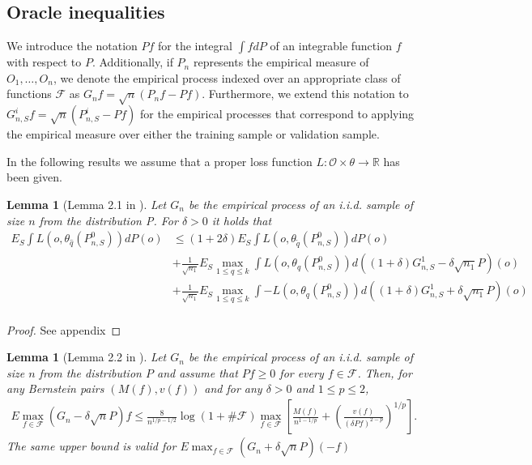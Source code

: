 \documentclass[11pt, a4paper]{article}
\newtheorem{lemma}[theorem]{Lemma}
\theoremstyle{definition}
\theoremstyle{remark}
\newcommand{\q}{q}
\newcommand{\btheta}{\theta}
\begin{document}
\subsection{Oracle inequalities}
We introduce the notation $Pf$ for the integral $\int f dP$ of an integrable function $f$ with respect to $P$. Additionally, if $P_n$ represents the empirical measure of $O_1, \dots, O_n$, we denote the empirical process indexed over an appropriate class of functions $\mathcal{F}$ as $G_n f = \sqrt{n}(P_n f - P f)$. Furthermore, we extend this notation to $G_{n, S}^{i} f = \sqrt{n}(P_{n, S}^{i} - Pf)$ for the empirical processes that correspond to applying the empirical measure over either the training sample or validation sample.

In the following results we assume that a proper loss function $ L: \mathcal{O} \times \btheta \to \mathbb{R} $ has been given.  
\begin{lemma}[Lemma 2.1 in \cite{vaart06}] \label{finitesampledecomp}
    Let $ G_{n} $ be the empirical process of an i.i.d. sample of size $ n $ from the distribution P. For $ \delta > 0 $ it holds that
   \begin{align*}
       E_{S} \int L(o, \btheta_{ \hat{\q}}(P_{n, S}^{0})) dP(o) &\leq (1 + 2 \delta) E_{S} \int L(o, \btheta_{ \tilde{\q} }(P_{n, S}^{0})) d P(o) \\ 
                                                                &+\frac{1}{\sqrt{n_1} } E_{S} \max_{1 \leq \q \leq k} \int L(o, \btheta_{\q}(P_{n, S}^{0})) d ((1 + \delta) G_{n,S}^{1} - \delta \sqrt{n_1} P)(o)  \\
                                                                &+\frac{1}{\sqrt{n_1} } E_{S} \max_{1 \leq \q \leq k} \int-L(o, \btheta_{\q}(P_{n, S}^{0})) d ((1 + \delta) G_{n,S}^{1} + \delta \sqrt{n_1} P)(o)  \\
   \end{align*}
\end{lemma}
\begin{proof}
    See appendix
\end{proof}

\begin{lemma}[Lemma 2.2 in \cite{vaart06}] \label{finitesamplebound}
    Let $G_{n}$ be the empirical process of an i.i.d. sample of size $n$ from the distribution $P$ and assume that $P f \geq 0$ for every $f \in \mathcal{F}$. Then, for any Bernstein pairs $(M(f), v(f))$ and for any $\delta>0$ and $1 \leq p \leq 2$,
    \begin{align*}
    E \max_{f \in \mathcal{F}}(G_n-\delta \sqrt{n} P) f \leq \frac{8}{n^{1 / p-1 / 2}} \log (1+\# \mathcal{F}) \max _{f \in \mathcal{F}}\left[\frac{M(f)}{n^{1-1 / p}}+\left(\frac{v(f)}{(\delta P f)^{2-p}}\right)^{1 / p}\right].
    \end{align*}
    The same upper bound is valid for $ E \max_{f \in \mathcal{F}}(G_n+\delta \sqrt{n} P)(-f) $  
\end{lemma}
\end{document}
